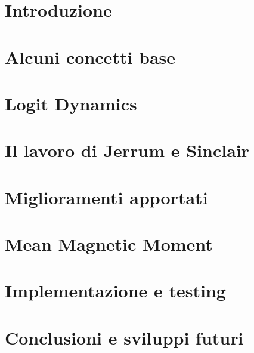 \documentclass[11pt,oneside]{book}
\theoremstyle{plain}
\begin{document}
\vfill

{\hypersetup{linkcolor=black}
	\tableofcontents
}

\chapter{Introduzione}
\setcounter{page}{1} 		%



\chapter{Alcuni concetti base}


\chapter{Logit Dynamics}


\chapter{Il lavoro di Jerrum e Sinclair}


\chapter{Miglioramenti apportati}


\chapter{Mean Magnetic Moment}


\chapter{Implementazione e testing}


\chapter{Conclusioni e sviluppi futuri}






\end{document}
